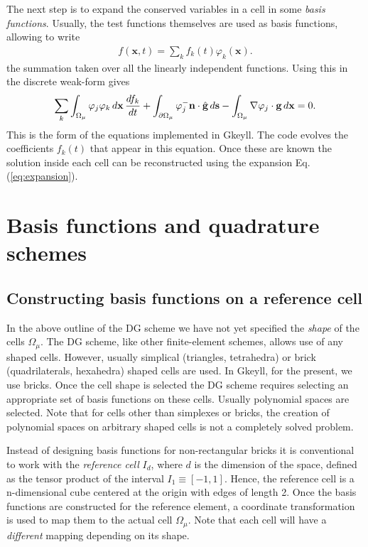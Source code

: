 \documentclass[11pt, reqno]{amsart}
\newcommand{\eqr}[1]{Eq.\thinspace(#1)}
\newcommand{\mvec}[1]{\mathbf{#1}}
\theoremstyle{definition}
\begin{document}
The next step is to expand the conserved variables in a cell in some
\emph{basis functions}. Usually, the test functions themselves are
used as basis functions, allowing to write
\begin{align}
  f(\mvec{x},t) = \sum_k f_k(t)
  \varphi_k(\mvec{x}) \label{eq:expansion}.
\end{align}
the summation taken over all the linearly independent functions. Using
this in the discrete weak-form gives
\begin{align}
  \sum_k \int_{\Omega_\mu} \varphi_j\varphi_k \thinspace d\mvec{x}
  \thinspace
  \frac{df_k}{dt} + \int_{\partial \Omega_\mu}\varphi_j^-
  \mvec{n}\cdot\hat{\mvec{g}}\thinspace d\mvec{s} 
  -
  \int_{\Omega_\mu}
  \nabla\varphi_j\cdot\mvec{g}\thinspace d\mvec{x} 
  = 0. \label{eq:dg}
\end{align}
This is the form of the equations implemented in Gkeyll. The code
evolves the coefficients $f_k(t)$ that appear in this equation. Once
these are known the solution inside each cell can be reconstructed
using the expansion \eqr{\ref{eq:expansion}}.

\section{Basis functions and quadrature schemes}

\subsection{Constructing basis functions on a reference cell}

In the above outline of the DG scheme we have not yet specified the
\emph{shape} of the cells $\Omega_\mu$. The DG scheme, like other
finite-element schemes, allows use of any shaped cells. However,
usually simplical (triangles, tetrahedra) or brick (quadrilaterals,
hexahedra) shaped cells are used. In Gkeyll, for the present, we use
bricks. Once the cell shape is selected the DG scheme requires
selecting an appropriate set of basis functions on these
cells. Usually polynomial spaces are selected.  Note that for cells
other than simplexes or bricks, the creation of polynomial spaces on
arbitrary shaped cells is not a completely solved problem.

Instead of designing basis functions for non-rectangular bricks it is
conventional to work with the \emph{reference cell} $I_d$, where $d$
is the dimension of the space, defined as the tensor product of the
interval $I_1 \equiv [-1,1]$. Hence, the reference cell is a
n-dimensional cube centered at the origin with edges of length 2. Once
the basis functions are constructed for the reference element, a
coordinate transformation is used to map them to the actual cell
$\Omega_\mu$. Note that each cell will have a \emph{different} mapping
depending on its shape.
\end{document}
